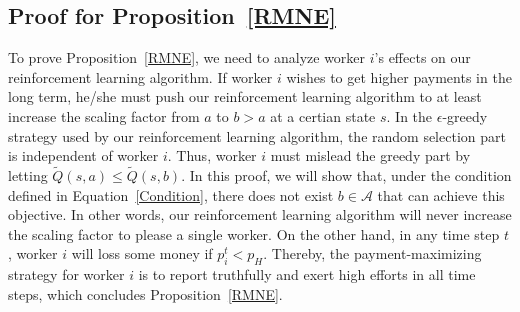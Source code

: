 %

\subsection{Proof for Proposition~\ref{RMNE}}
To prove Proposition~\ref{RMNE}, we need to analyze worker $i$'s effects on our reinforcement learning algorithm.
If worker $i$ wishes to get higher payments in the long term, he/she must push our reinforcement learning algorithm to at least increase the scaling factor from $a$ to $b>a$ at a certian state $s$.
In the $\epsilon$-greedy strategy used by our reinforcement learning algorithm, the random selection part is independent of worker $i$.
Thus, worker $i$ must mislead the greedy part by letting $\tilde{Q}(s,a)\leq \tilde{Q}(s,b)$.
In this proof, we will show that, under the condition defined in Equation~\ref{Condition}, there does not exist $b\in \mathcal{A}$ that can achieve this objective.
In other words, our reinforcement learning algorithm will never increase the scaling factor to please a single worker.
On the other hand, in any time step $t$, worker $i$ will loss some money if $p_i^t<p_H$.
Thereby, the payment-maximizing strategy for worker $i$ is to report truthfully and exert high efforts in all time steps, which concludes Proposition~\ref{RMNE}.

